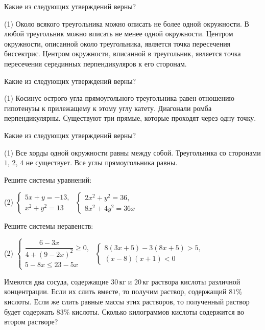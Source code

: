 \begin{homework}[number=1]
	\begin{listofex}
		\item Какие из следующих утверждений верны?
		\begin{tasks}(1)
			\task Около всякого треугольника можно описать не более одной окружности.
			\task В любой треугольник можно вписать не менее одной окружности.
			\task Центром окружности, описанной около треугольника, является точка пересечения биссектрис.
			\task Центром окружности, вписанной в треугольник, является точка пересечения серединных перпендикуляров к его сторонам.
		\end{tasks}
		\item Какие из следующих утверждений верны?
		\begin{tasks}(1)
			\task Косинус острого угла прямоугольного треугольника равен отношению гипотенузы к прилежащему к этому углу катету.
			\task Диагонали ромба перпендикулярны.
			\task Существуют три прямые, которые проходят через одну точку.
		\end{tasks}
		\item Какие из следующих утверждений верны?
		\begin{tasks}(1)
			\task Все хорды одной окружности равны между собой.
			\task Треугольника со сторонами \( 1 \), \( 2 \), \( 4 \) не существует.
			\task Все углы прямоугольника равны.
		\end{tasks}
		\item Решите системы уравнений:
		\begin{tasks}(2)
			\task \( \begin{cases}
				5x+y=-13,\\
				x^2+y^2=13
			\end{cases} \)
			\task \( \begin{cases}
				2x^2+y^2=36,\\
				8x^2+4y^2=36x
			\end{cases} \)
		\end{tasks}
		\item Решите системы неравенств:
		\begin{tasks}(2)
			\task \( \begin{cases}
				\dfrac{6-3x}{4+(9-2x)^2}\ge0,\\
			 	5-8x\le23-5x
			\end{cases} \)
			\task \( \begin{cases}
				8(3x+5)-3(8x+5)>5,\\
				(x-8)(x+1)<0
			\end{cases} \)
		\end{tasks}
		\item Имеются два сосуда, содержащие \( 30 \) кг и \( 20 \) кг раствора кислоты различной концентрации. Если их слить вместе, то получим раствор, содержащий \( 81\% \) кислоты. Если же слить равные массы этих растворов, то полученный раствор будет содержать \( 83\% \) кислоты. Сколько килограммов кислоты содержится во втором растворе?
	\end{listofex}
\end{homework}

